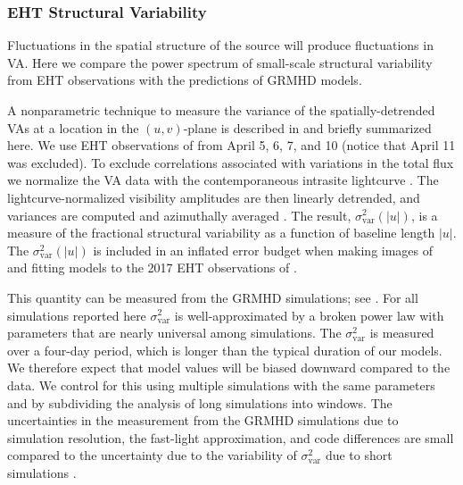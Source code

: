\subsubsection{EHT Structural Variability}

Fluctuations in the spatial structure of the source will produce fluctuations in VA.  Here we compare  the power spectrum of small-scale structural variability from EHT observations with the predictions of GRMHD models.

A nonparametric technique to measure the variance of the spatially-detrended VAs at a location in the $(u,v)$-plane is described in \citet{NoiseModeling} and briefly summarized here.  We use EHT observations of \sgra from April 5, 6, 7, and 10 (notice that April 11 was excluded).  To exclude correlations associated with  variations in the total flux we normalize the VA data with the contemporaneous intrasite lightcurve \citep{Georgiev_2022}.  The lightcurve-normalized visibility amplitudes are then linearly detrended, and variances are computed and azimuthally averaged \citep{NoiseModeling}.  The result, $\sigma_\text{var}^2 (|u|)$, is a measure of the fractional structural variability as a function of baseline length $|u|$.  The $\sigma_\text{var}^2 (|u|)$ is included in an inflated error budget when making images of and fitting models to the 2017 EHT observations of \sgra {}.

This quantity can be measured from the GRMHD simulations; see \citet{Georgiev_2022}. For all simulations reported here $\sigma_\text{var}^2$ is well-approximated by a broken power law with parameters that are nearly universal among simulations.
The $\sigma_\text{var}^2$ is measured over a four-day period, which is longer than the typical duration of our models.  We therefore expect that model values will be biased downward compared to the data.  We control for this using multiple simulations with the same parameters and by subdividing the analysis of long simulations into windows.
The uncertainties in the measurement from the GRMHD simulations due to simulation resolution, the fast-light approximation, and code differences are small compared to the uncertainty due to the variability of $\sigma_\text{var}^2$ due to short simulations \citep{Georgiev_2022}.

